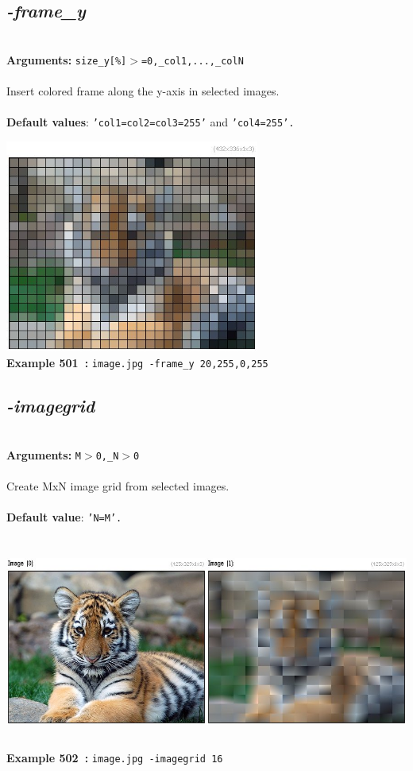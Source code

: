 \documentclass[a4paper,11pt,twoside]{book}
\begin{document}
\subsection{\emph{-frame\_y} }\vspace*{-0.5em}
~\\\textbf{Arguments: } 
{\small \texttt{size\_y[\%]$>$=0,\_col1,...,\_colN}}\\~\\
Insert colored frame along the y-axis in selected images.
~\\~\\\textbf{Default values}: {\small \texttt{'col1=col2=col3=255'} and \texttt{'col4=255'.}}
\begin{center}\includegraphics[keepaspectratio=true,height=7cm,width=\textwidth]{img/gmic_def501.jpg}\\
{\footnotesize \textbf{Example 501~:} \texttt{image.jpg -frame\_y 20,255,0,255}}
\end{center}

\subsection{\emph{-imagegrid} }\vspace*{-0.5em}
~\\\textbf{Arguments: } 
{\small \texttt{M$>$0,\_N$>$0}}\\~\\
Create MxN image grid from selected images.
~\\~\\\textbf{Default value}: {\small \texttt{'N=M'.}}
\begin{center}\includegraphics[keepaspectratio=true,height=7cm,width=\textwidth]{img/gmic_def502.jpg}\\
{\footnotesize \textbf{Example 502~:} \texttt{image.jpg -imagegrid 16}}
\end{center}
\end{document}
